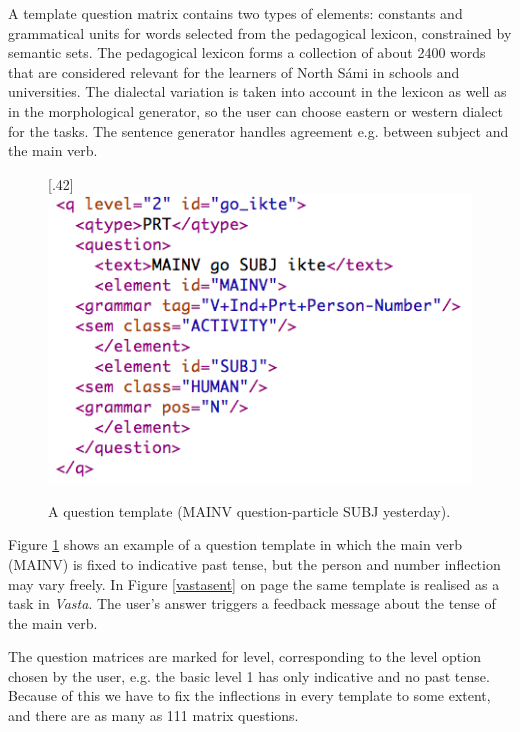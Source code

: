 \documentclass[11pt]{article}
\begin{document}
A template question matrix contains two types of elements: constants and grammatical units for words selected from the pedagogical lexicon, constrained by semantic sets. The pedagogical lexicon forms a collection of about 2400 words that are considered relevant for the learners of North Sámi in schools and universities. The dialectal variation is taken into account in the lexicon as well as in the morphological generator, so the user can choose eastern or western dialect for the tasks. The sentence generator handles agreement e.g. between subject and the main verb. \\ 

\begin{figure}[htbp]
\begin{center}
\scalebox{.42}[.42]{\includegraphics{presentation/img/sentencegenerator.png}}\\
\caption{A question template (MAINV question-particle SUBJ yesterday).}
\label{sentgen}
\end{center}
\end{figure}

Figure \ref{sentgen} shows an example of a question template in which the main verb (MAINV) is fixed to indicative past tense, but the person and number inflection may vary freely. In Figure \ref{vastasent} on page \pageref{vastasent} the same template is realised as a task in \textit{Vasta}. The user's answer triggers a feedback message about the tense of the main verb. 

The question matrices are marked for level, corresponding to the level option chosen by the user, e.g. the basic level 1 has only indicative and no past tense. Because of this we have to fix the inflections in every template to some extent, and there are as many as 111 matrix questions. \\
 
\end{document}
